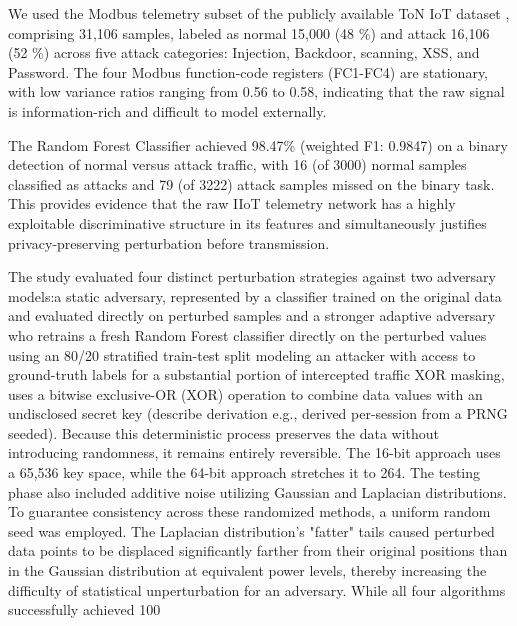 \documentclass[conference]{IEEEtran}
\begin{document}
We used the Modbus telemetry subset of the publicly available ToN IoT dataset \cite{dataset}, comprising 31,106 samples, labeled as normal 15,000 (48 \%) and attack 16,106 (52 \%) across five attack categories: Injection, Backdoor, scanning, XSS, and Password. The four Modbus function-code registers (FC1-FC4) are stationary, with low variance ratios ranging from 0.56 to 0.58, indicating that the raw signal is information-rich and difficult to model externally.

The Random Forest Classifier achieved 98.47\% (weighted F1: 0.9847) on a binary detection of normal versus attack traffic, with 16 (of 3000) normal samples classified as attacks and 79 (of 3222) attack samples missed on the binary task. This provides evidence that the raw IIoT telemetry network has a highly exploitable discriminative structure in its features and simultaneously justifies privacy-preserving perturbation before transmission. 

The study evaluated four distinct perturbation strategies against two adversary models:a static adversary, represented by a classifier trained on the original data and evaluated directly on perturbed samples and a stronger adaptive adversary who retrains a fresh Random Forest classifier directly on the perturbed values using an 80/20 stratified train-test split modeling an attacker with access to ground-truth labels for a substantial portion of intercepted traffic XOR masking, uses a bitwise exclusive-OR (XOR) operation to combine data values with an undisclosed secret key (describe derivation e.g., derived per-session from a PRNG seeded). Because this deterministic process preserves the data without introducing randomness, it remains entirely reversible. The 16-bit approach uses a 65,536 key space, while the 64-bit approach stretches it to 264. The testing phase also included additive noise utilizing Gaussian and Laplacian distributions. To guarantee consistency across these randomized methods, a uniform random seed was employed. The Laplacian distribution's "fatter" tails caused perturbed data points to be displaced significantly farther from their original positions than in the Gaussian distribution at equivalent power levels, thereby increasing the difficulty of statistical unperturbation for an adversary. While all four algorithms successfully achieved 100%
\end{document}
